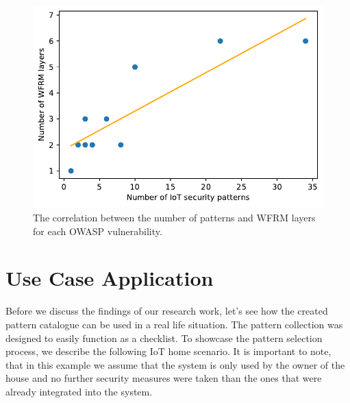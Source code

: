 \begin{figure}[ht]
	\centering
	\includegraphics[width=0.9\linewidth]{img/correlation}
	\caption{The correlation between the number of patterns and WFRM layers for each OWASP vulnerability.}
	\label{fig:corr}
\end{figure}


\section{Use Case Application}\label{sec:use_case}
Before we discuss the findings of our research work, let's see how the created pattern catalogue can be used in a real life situation. The pattern collection was designed to easily function as a checklist. To showcase the pattern selection process, we describe the following IoT home scenario. It is important to note, that in this example we assume that the system is only used by the owner of the house and no further security measures were taken than the ones that were already integrated into the system. 

